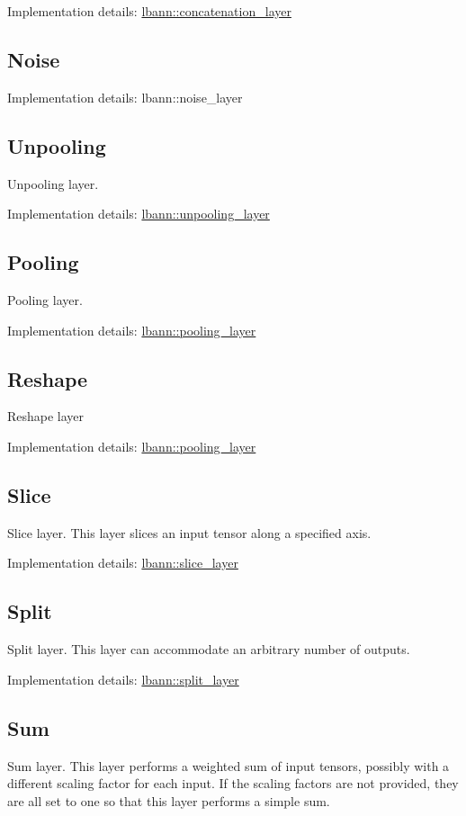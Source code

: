 Implementation details\+: \hyperlink{classlbann_1_1concatenation__layer}{lbann\+::concatenation\+\_\+layer}\hypertarget{layers_noise}{}\subsection{Noise}\label{layers_noise}
Implementation details\+: lbann\+::noise\+\_\+layer\hypertarget{layers_unpooling}{}\subsection{Unpooling}\label{layers_unpooling}
Unpooling layer.

Implementation details\+: \hyperlink{classlbann_1_1unpooling__layer}{lbann\+::unpooling\+\_\+layer}\hypertarget{layers_pooling}{}\subsection{Pooling}\label{layers_pooling}
Pooling layer.

Implementation details\+: \hyperlink{classlbann_1_1pooling__layer}{lbann\+::pooling\+\_\+layer}\hypertarget{layers_reshape}{}\subsection{Reshape}\label{layers_reshape}
Reshape layer

Implementation details\+: \hyperlink{classlbann_1_1pooling__layer}{lbann\+::pooling\+\_\+layer}\hypertarget{layers_slice}{}\subsection{Slice}\label{layers_slice}
Slice layer. This layer slices an input tensor along a specified axis.

Implementation details\+: \hyperlink{classlbann_1_1slice__layer}{lbann\+::slice\+\_\+layer}\hypertarget{layers_split}{}\subsection{Split}\label{layers_split}
Split layer. This layer can accommodate an arbitrary number of outputs.

Implementation details\+: \hyperlink{classlbann_1_1split__layer}{lbann\+::split\+\_\+layer}\hypertarget{layers_sum}{}\subsection{Sum}\label{layers_sum}
Sum layer. This layer performs a weighted sum of input tensors, possibly with a different scaling factor for each input. If the scaling factors are not provided, they are all set to one so that this layer performs a simple sum.

